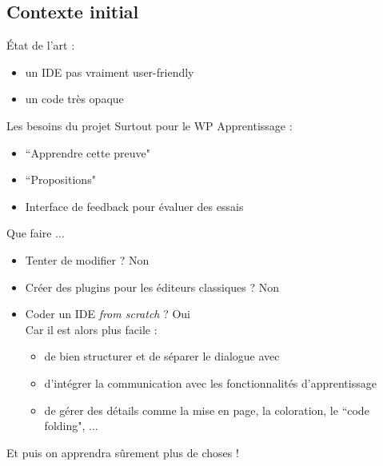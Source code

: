 \newcommand{\qcodeedit}{QCodeEdit~}
\newcommand{\qtermwidget}{QTermWidget~}
\newcommand{\stdout}{StdOut~}
\newcommand{\stderr}{StdErr~}

\subsection{Contexte initial}

    \begin{frame}{État de l'art : \coqide}

        \begin{itemize}
        	\item un IDE pas vraiment user-friendly
        	\item un code très opaque
	    \end{itemize}
	\end{frame}
		
	\begin{frame}{Les besoins du projet \coquille}
        Surtout pour le WP Apprentissage :
	    \begin{itemize}
		    \item ``Apprendre cette preuve"
		    \item ``Propositions"
		    \item Interface de feedback pour évaluer des essais
	    \end{itemize}
	\end{frame}

    \begin{frame}{Que faire $\ldots$}
        \begin{itemize}
        	\item Tenter de modifier \coqide ? \pause Non
        	\pause
        	\item Créer des plugins pour les éditeurs classiques ? \pause Non
        	\pause
        	\item Coder un IDE \textit{from scratch} ? \pause Oui\\
        	\pause
        	\pause Car il est alors plus facile :
        	\begin{itemize}
        		\item de bien structurer et de séparer le dialogue avec \coq
        		\item d'intégrer la communication avec les fonctionnalités d'apprentissage
        		\item de gérer des détails comme la mise en page, la coloration, le ``code folding", $\ldots$
            \end{itemize}
        \end{itemize}
        \pause
        Et puis on apprendra sûrement plus de choses !
	\end{frame}

